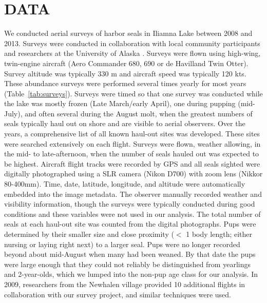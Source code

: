 \documentclass[]{risa}\usepackage[]{graphicx}\usepackage[]{color}
\begin{document}
\section{DATA}
We conducted aerial surveys of harbor seals in Iliamna Lake between 2008 and 2013. Surveys were conducted in collaboration with local community participants and researchers at the University of Alaska \citep{Burn:Van:With:Hole:Asko:inte:2016}. Surveys were flown using high-wing, twin-engine aircraft (Aero Commander 680, 690 or de Havilland Twin Otter). Survey altitude was typically 330 m and aircraft speed was typically 120 kts. These abundance surveys were performed several times yearly for most years (Table~\ref{tab:surveys}). Surveys were timed so that one survey was conducted while the lake was mostly frozen (Late March/early April), one during pupping (mid-July), and often several during the August molt, when the greatest numbers of seals typically haul out on shore and are visible to aerial observers. Over the years, a comprehensive list of all known haul-out sites was developed. These sites were searched extensively on each flight. Surveys were flown, weather allowing, in the mid- to late-afternoon, when the number of seals hauled out was expected to be highest. Aircraft flight tracks were recorded by GPS and all seals sighted were digitally photographed using a SLR camera (Nikon D700) with zoom lens (Nikkor 80-400mm). Time, date, latitude, longitude, and altitude were automatically embedded into the image metadata. The observer manually recorded weather and visibility information, though the surveys were typically conducted during good conditions and these variables were not used in our analysis. The total number of seals at each haul-out site was counted from the digital photographs. Pups were determined by their smaller size and close proximity ($<$ 1 body length; either nursing or laying right next) to a larger seal. Pups were no longer recorded beyond about mid-August when many had been weaned. By that date the pups were large enough that they could not reliably be distinguished from yearlings and 2-year-olds, which we lumped into the non-pup age class for our analysis. In 2009, researchers from the Newhalen village provided 10 additional flights in collaboration with our survey project, and similar techniques were used. 
\end{document}
